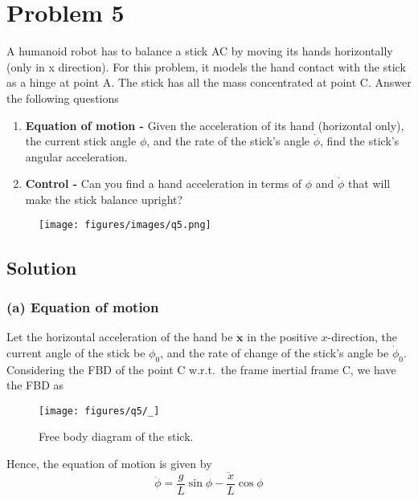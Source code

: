 \section*{Problem 5}

A humanoid robot has to balance a stick AC by moving its hands horizontally (only in x direction).
For this problem, it models the hand contact with the stick as a hinge at point A.
The stick has all the mass concentrated at point C.
Answer the following questions

\begin{enumerate}[label = (\alph*)]
    \item \textbf{Equation of motion -} Given the acceleration of its hand (horizontal only), the current stick angle \( \phi \), and the rate of the stick's angle \( \dot\phi \), find the stick's angular acceleration.
    \item \textbf{Control -} Can you find a hand acceleration in terms of \( \phi \) and \( \dot\phi \) that will make the stick balance upright?
\end{enumerate}

\begin{figure*}[h]
    \centering
    \texttt{[image: figures/images/q5.png]}
\end{figure*}

\subsection*{Solution}

\subsubsection*{(a) Equation of motion}

Let the horizontal acceleration of the hand be \( \mathbf{\ddot x} \) in the positive \(x\)-direction, the current angle of the stick be \( \phi_0 \), and the rate of change of the stick's angle be \( \dot\phi_0 \).
Considering the FBD of the point C w.r.t.\ the frame inertial frame C, we have the FBD as

\begin{figure*}[htb]
    \centering
    \texttt{[image: figures/q5/\_]}
    \caption{
        Free body diagram of the stick.
    }
\end{figure*}


Hence, the equation of motion is given by
\[
    \boxed{
        \ddot{\phi} = \frac{g}{L} \sin\phi - \frac{\ddot x}{L} \cos\phi
    }
\]
